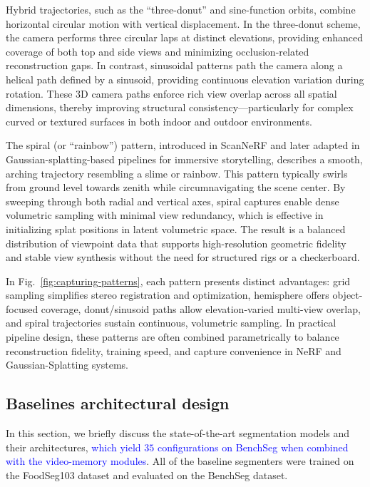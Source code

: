 \documentclass[preprint,12pt]{elsarticle}
\newcommand{\change}[1]{\textcolor{blue}{#1}}
\begin{document}
Hybrid trajectories, such as the “three-donut” and sine-function orbits, combine horizontal circular motion with vertical displacement. In the three-donut scheme, the camera performs three circular laps at distinct elevations, providing enhanced coverage of both top and side views and minimizing occlusion-related reconstruction gaps. In contrast, sinusoidal patterns path the camera along a helical path defined by a sinusoid, providing continuous elevation variation during rotation. These 3D camera paths enforce rich view overlap across all spatial dimensions, thereby improving structural consistency—particularly for complex curved or textured surfaces in both indoor and outdoor environments.

The spiral (or “rainbow”) pattern, introduced in ScanNeRF \cite{de2023scannerf} and later adapted in Gaussian-splatting-based pipelines for immersive storytelling, describes a smooth, arching trajectory resembling a slime or rainbow. This pattern typically swirls from ground level towards zenith while circumnavigating the scene center. By sweeping through both radial and vertical axes, spiral captures enable dense volumetric sampling with minimal view redundancy, which is effective in initializing splat positions in latent volumetric space. The result is a balanced distribution of viewpoint data that supports high-resolution geometric fidelity and stable view synthesis without the need for structured rigs or a checkerboard. 

In Fig.~\ref{fig:capturing-patterns}, each pattern presents distinct advantages: grid sampling simplifies stereo registration and optimization, hemisphere offers object-focused coverage, donut/sinusoid paths allow elevation-varied multi-view overlap, and spiral trajectories sustain continuous, volumetric sampling. In practical pipeline design, these patterns are often combined parametrically to balance reconstruction fidelity, training speed, and capture convenience in NeRF and Gaussian-Splatting systems.



\subsection{Baselines architectural design}
\label{sec:baselines_architectural_design}
In this section, we briefly discuss the state-of-the-art segmentation models and their architectures, \change{which yield $35$ configurations on BenchSeg when combined with the video-memory modules}. All of the baseline segmenters were trained on the FoodSeg103 dataset and evaluated on the BenchSeg dataset. 
\end{document}
